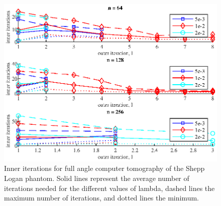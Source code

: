 \begin{figure}[htbp]
\begin{center}
\includegraphics{figures/shepp_logan_inner_its}
\caption{Inner iterations for full angle computer tomography of the Shepp Logan phantom.  Solid lines represent the average number of iterations needed for the different values of lambda, dashed lines the maximum number of iterations, and dotted lines the minimum.}
\label{fig:shepp_logan_inner_its}
\end{center}
\end{figure}

